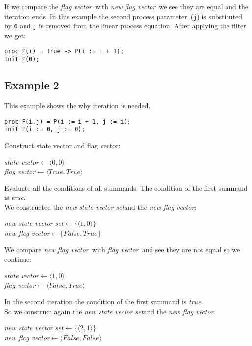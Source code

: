 \documentclass[a4paper,10pt]{article}
\theoremstyle{plain}
\theoremstyle{definition}
\newcommand{\lpe}{linear process equation}
\newcommand{\pp}{process parameter}
\newcommand{\ti}{\textit}
\newcommand{\sv}{\textit{state vector}}
\newcommand{\fv}{\textit{flag vector}}
\newcommand{\svs}{\textit{new state vector set}}
\newcommand{\nfv}{\textit{new flag vector}}
\newcommand{\la}{$\leftarrow$}
\begin{document}
If we compare the \fv\ with \ti{new} \fv\ we see they are equal and the iteration ends.
In this example the second \pp\ (\verb"j") is substituted by \verb"0" and \verb"j" is removed from the \lpe.
After applying the filter we get:\\
\begin{verbatim}
proc P(i) = true -> P(i := i + 1);
Init P(0);
\end{verbatim}

\subsection{Example 2}
This example shows the why iteration is needed.
\begin{verbatim}
proc P(i,j) = P(i := i + 1, j := i);
init P(i := 0, j := 0); 
\end{verbatim}
 
Construct state vector and flag vector: 
\begin{center}\begin{minipage}{250pt}
\sv \la  $\langle 0 , 0 \rangle$\\
\fv \la  $\langle True , True \rangle$\\
\end{minipage}\end{center}

Evaluate all the conditions of all summands.
The condition of the first summand is \ti{true}.\\

We constructed the \svs and the \nfv :
\begin{center}\begin{minipage}{250pt}
\svs \la  $\lbrace \langle 1 , 0 \rangle \rbrace $\\
\nfv \la  $\lbrace False , True \rbrace $\\
\end{minipage}\end{center}

We compare \ti{new} \fv\ with \fv\ and see they are not equal so we continue:
\begin{center}\begin{minipage}{250pt}
\sv \la $\langle 1 , 0 \rangle $\\
\fv \la $\langle False , True \rangle $\\
\end{minipage}\end{center}

In the second iteration the condition of the first summand is \ti{true}.\\
So we construct again the \svs and the \nfv\: 
\begin{center}\begin{minipage}{250pt}
\svs \la  $\lbrace \langle 2 , 1 \rangle \rbrace $\\
\nfv \la  $\langle False , False \rangle $ \\
\end{minipage}\end{center}
\end{document}

